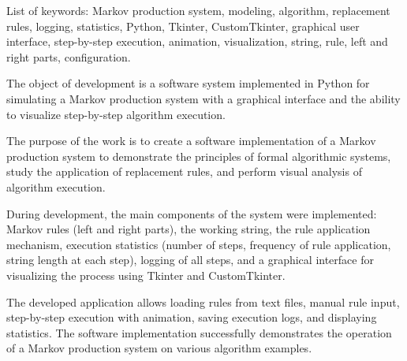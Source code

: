 List of keywords: Markov production system, modeling, algorithm, replacement rules, logging, statistics, Python, Tkinter, CustomTkinter, graphical user interface, step-by-step execution, animation, visualization, string, rule, left and right parts, configuration.

The object of development is a software system implemented in Python for simulating a Markov production system with a graphical interface and the ability to visualize step-by-step algorithm execution.

The purpose of the work is to create a software implementation of a Markov production system to demonstrate the principles of formal algorithmic systems, study the application of replacement rules, and perform visual analysis of algorithm execution.

During development, the main components of the system were implemented: Markov rules (left and right parts), the working string, the rule application mechanism, execution statistics (number of steps, frequency of rule application, string length at each step), logging of all steps, and a graphical interface for visualizing the process using Tkinter and CustomTkinter.

The developed application allows loading rules from text files, manual rule input, step-by-step execution with animation, saving execution logs, and displaying statistics. The software implementation successfully demonstrates the operation of a Markov production system on various algorithm examples.
